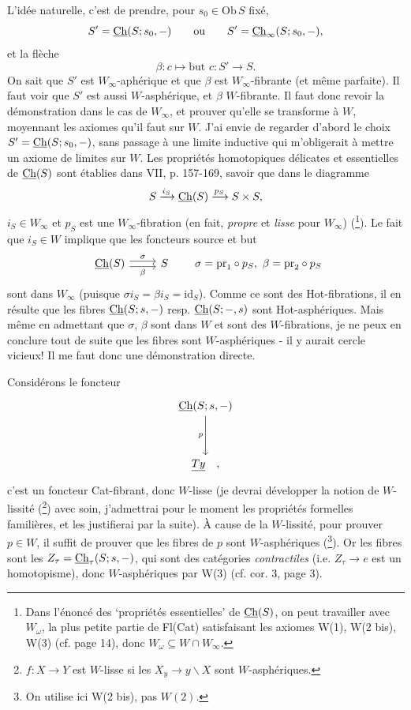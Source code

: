 L'idée naturelle, c'est de prendre, pour $s_0 \in \mathrm{Ob}\,S$ fixé,
\[ S' = \underline{\mathrm{Ch}}(S; s_0, -) \qquad \text{ou} \qquad S' = \underline{\mathrm{Ch}}_\infty(S; s_0, -), \]
et la flèche
\[ \beta : c \longmapsto \text{but } c : S' \longrightarrow S. \]
On sait que $S'$ est $W_\infty$-aphérique et que $\beta$ est $W_\infty$-fibrante (et même parfaite). Il faut voir que $S'$ est aussi $W$-asphérique, et $\beta$ $W$-fibrante. Il faut donc revoir la démonstration dans le cas de $W_\infty$, et prouver qu'elle se transforme à $W$, %
moyennant les axiomes qu'il faut sur $W$. J'ai envie de regarder d'abord le choix $S' = \underline{\mathrm{Ch}}(S; s_0, -)$, sans passage à une limite inductive qui m'obligerait à mettre un axiome de limites sur $W$. Les propriétés homotopiques délicates et essentielles de $\underline{\mathrm{Ch}}(S)$ sont établies dans VII, p. 157-169, savoir que dans le diagramme
\[ S \xrightarrow{i_S} \underline{\mathrm{Ch}}(S) \xrightarrow{p_S} S \times S, \]
$i_S \in W_\infty$ et $p_S$ est une $W_\infty$-fibration (en fait, \textit{propre} et \textit{lisse} pour $W_\infty$) (\footnote[12]{Dans l'énoncé des ‘propriétés essentielles’ de $\underline{\mathrm{Ch}}(S)$, on peut travailler avec $W_\omega$, la plus petite partie de Fl(Cat) satisfaisant les axiomes W(1), W(2 bis), W(3) (cf. page 14), donc $W_\omega \subseteq W \cap W_\infty$.}). Le fait que $i_S \in W$ implique que les foncteurs source et but
\[ \begin{tikzcd} \Ch(S) \arrow[r, shift left, "\sigma"] \arrow[r, shift right, "\beta"'] & S \end{tikzcd} \qquad \sigma = \mathrm{pr}_1 \circ p_S,\ \beta = \mathrm{pr}_2 \circ p_S \]
sont dans $W_\infty$ (puisque $\sigma i_S = \beta i_S = \mathrm{id}_S$). Comme ce sont des Hot-fibrations, il en résulte que les fibres $\underline{\mathrm{Ch}}(S; s, -)$ resp. $\underline{\mathrm{Ch}}(S; -, s)$ sont Hot-asphériques. Mais même en admettant que $\sigma$, $\beta$ sont dans $W$ et sont des $W$-fibrations, je ne peux en conclure tout de suite que les fibres sont $W$-asphériques - il y aurait cercle vicieux! Il me faut donc une démonstration directe.

Considérons le foncteur
\[
\begin{tikzcd}[row sep=huge]
\Ch(S; s, -) \arrow[d, "p"'] \\
\underline{Ty} \quad ,
\end{tikzcd}
\]
c'est un foncteur Cat-fibrant, donc $W$-lisse (je devrai développer la notion de $W$-lissité (\footnote[13]{$f : X \longrightarrow Y$ est $W$-lisse si les $X_y \longrightarrow y\backslash X$ sont $W$-asphériques.}) avec soin, j'admettrai pour le moment les propriétés formelles familières, et les justifierai par la suite). À cause de la $W$-lissité, pour prouver $p \in W$, il suffit de
prouver que les fibres de $p$ sont $W$-asphériques (\footnote[14]{On utilise ici W(2 bis), pas $W(2)$.}). Or les fibres sont les $Z_\tau = \underline{\mathrm{Ch}}_\tau(S; s, -)$, qui sont des catégories \textit{contractiles} (i.e. $Z_\tau \longrightarrow e$ est un homotopisme), donc $W$-asphériques par W(3) (cf. cor. 3, page 3).

